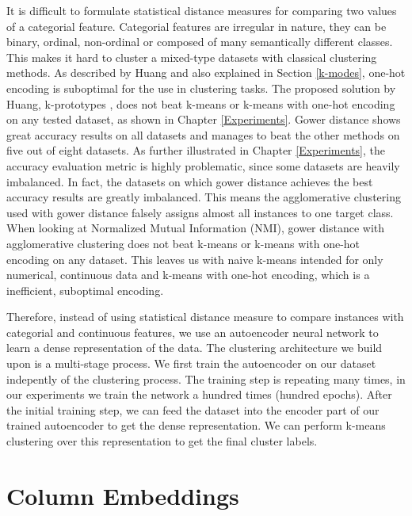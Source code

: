 It is difficult to formulate statistical distance measures for comparing two values of a categorial feature. Categorial features are irregular in nature, they can be binary, ordinal, non-ordinal or composed of many semantically different classes. This makes it hard to cluster a mixed-type datasets with classical clustering methods. As described by Huang \cite{kmodes} and also explained in Section \ref{k-modes}, one-hot encoding is suboptimal for the use in clustering tasks. The proposed solution by Huang, k-prototypes \cite{kmodes}, does not beat k-means or k-means with one-hot encoding on any tested dataset, as shown in Chapter \ref{Experiments}. Gower distance shows great accuracy results on all datasets and manages to beat the other methods on five out of eight datasets. As further illustrated in Chapter \ref{Experiments}, the accuracy evaluation metric is highly problematic, since some datasets are heavily imbalanced. In fact, the datasets on which gower distance achieves the best accuracy results are greatly imbalanced. This means the agglomerative clustering used with gower distance falsely assigns almost all instances to one target class. When looking at Normalized Mutual Information (NMI), gower distance with agglomerative clustering does not beat k-means or k-means with one-hot encoding on any dataset. This leaves us with naive k-means intended for only numerical, continuous data and k-means with one-hot encoding, which is a inefficient, suboptimal encoding.

Therefore, instead of using statistical distance measure to compare instances with categorial and continuous features, we use an autoencoder neural network to learn a dense representation of the data. The clustering architecture we build upon is a multi-stage process. We first train the autoencoder on our dataset indepently of the clustering process. The training step is repeating many times, in our experiments we train the network a hundred times (hundred epochs). After the initial training step, we can feed the dataset into the encoder part of our trained autoencoder to get the dense representation. We can perform k-means clustering over this representation to get the final cluster labels.

\section{Column Embeddings}

